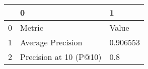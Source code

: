 \begin{tabular}{lll}
\toprule
{} &                       0 &         1 \\
\midrule
0 &                  Metric &     Value \\
1 &       Average Precision &  0.906553 \\
2 &  Precision at 10 (P@10) &       0.8 \\
\bottomrule
\end{tabular}
